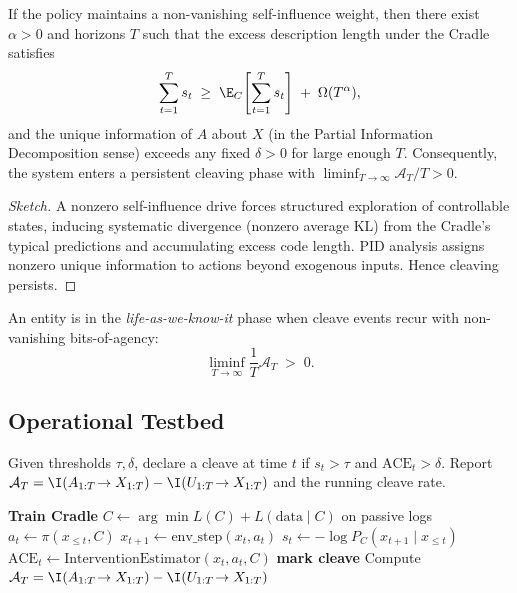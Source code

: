 \begin{theorem}\label{thm:persistent}
If the policy maintains a non-vanishing self-influence weight, then there exist \(\alpha>0\) and horizons \(T\) such that the excess description length under the Cradle satisfies
\[
\sum_{t=1}^{T} s_t \;\ge\; \E_{C}\!\left[\sum_{t=1}^{T} s_t\right] \;+\; \Omega(T^{\alpha}),
\]
and the unique information of \(A\) about \(X\) (in the Partial Information Decomposition sense) exceeds any fixed \(\delta>0\) for large enough \(T\). Consequently, the system enters a persistent cleaving phase with \(\liminf_{T\to\infty}\mathcal{A}_T/T > 0\).
\end{theorem}

\begin{proof}[Sketch]
A nonzero self-influence drive forces structured exploration of controllable states, inducing systematic divergence (nonzero average KL) from the Cradle's typical predictions and accumulating excess code length. PID analysis assigns nonzero unique information to actions beyond exogenous inputs. Hence cleaving persists.
\end{proof}

\begin{corollary}
An entity is in the \emph{life-as-we-know-it} phase when cleave events recur with non-vanishing bits-of-agency:
\[
\liminf_{T\to\infty}\frac{1}{T}\mathcal{A}_T \;>\; 0.
\]
\end{corollary}

\subsection{Operational Testbed}

\begin{definition}
Given thresholds \(\tau,\delta\), declare a cleave at time \(t\) if \(s_t>\tau\) and \(\mathrm{ACE}_t>\delta\). Report
\(\mathcal{A}_T=\I(A_{1:T}\!\to X_{1:T})-\I(U_{1:T}\!\to X_{1:T})\) and the running cleave rate.
\end{definition}

\begin{algorithm}[H]
\caption{Cradle $\to$ Cleave Pipeline}
\begin{algorithmic}[1]
\State \textbf{Train Cradle} \(C \leftarrow \arg\min L(C)+L(\text{data}\mid C)\) on passive logs
  \State $a_t \leftarrow \pi(x_{\le t}, C)$ 
  \State $x_{t+1} \leftarrow \text{env\_step}(x_t, a_t)$
  \State $s_t \leftarrow -\log P_C(x_{t+1}\mid x_{\le t})$
  \State $\mathrm{ACE}_t \leftarrow \text{InterventionEstimator}(x_t,a_t,C)$
   \State \textbf{mark cleave} \EndIf
\EndFor
\State Compute $\mathcal{A}_T=\I(A_{1:T}\!\to X_{1:T})-\I(U_{1:T}\!\to X_{1:T})$
\end{algorithmic}
\end{algorithm}

